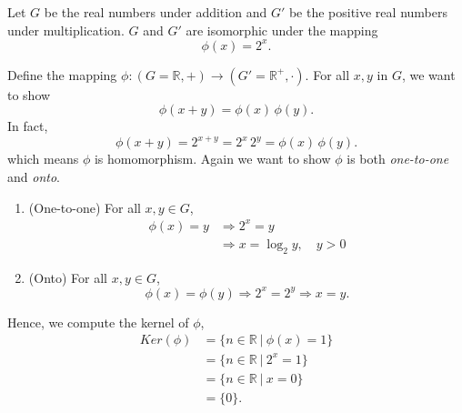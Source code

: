 \begin{example}
    Let $G$ be the real numbers under addition and $G'$ be the positive real numbers under multiplication. $G$ and $G'$
    are isomorphic under the mapping 
    \[
        \phi(x) = 2^x.
    \]
\end{example}
\begin{solution}
    Define the mapping $\phi: (G=\mathbb{R}, +) \to (G'=\mathbb{R}^+, \cdot)$. For all $x, y$ in $G$, we want to show
    \[
        \phi(x + y) = \phi(x)\, \phi(y).
    \]
    In fact, 
    \[
        \phi(x+y) = 2^{x + y} = 2^{x}\, 2^{y} = \phi(x)\, \phi(y).
    \]
    which means $\phi$ is homomorphism. Again we want to show $\phi$ 
    is both \textit{one-to-one} and \textit{onto}.

    \begin{enumerate}
        \item (One-to-one) For all $x, y \in G$, 
        \begin{align*}
            \phi(x) = y &\Rightarrow 2^x = y\\
            &\Rightarrow x = \log_2 y, \quad y > 0    
        \end{align*}

        \item (Onto) For all $x, y \in G$, 
        \[
            \phi(x) = \phi(y) \Rightarrow 2^x = 2^y \Rightarrow x = y.
        \]
    \end{enumerate}

    Hence, we compute the kernel of $\phi$,
    \begin{align*}
        Ker(\phi) &= \{ n \in \mathbb{R} \> | \> \phi(x) = 1 \}\\
        &= \{ n\in \mathbb{R} \> | \> 2^x = 1 \}\\
        &= \{ n\in \mathbb{R} \> | \> x = 0 \}\\
        &= \{ 0 \}.
    \end{align*}
\end{solution}

